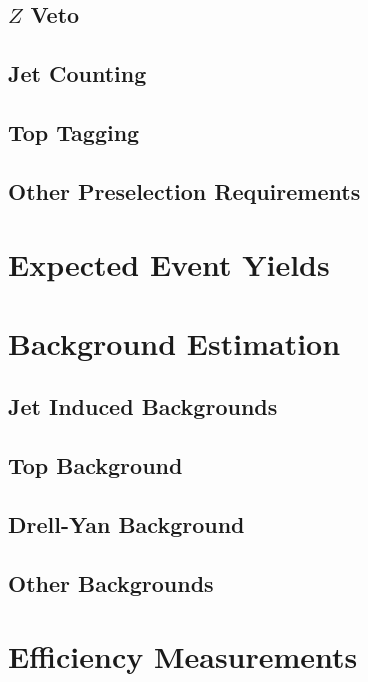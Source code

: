 \documentclass{cmspaper}
\begin{document}
  \subsection{$Z$ Veto}
    \label{sec:sel_zveto}
  \subsection{Jet Counting} 
    \label{sec:sel_jets}
  \subsection{Top Tagging}
    \label{sec:sel_toptag}
  \subsection{Other Preselection Requirements}
    \label{sec:sel_other}

\section{Expected Event Yields}
  \label{sec:yields}

\clearpage
\section{Background Estimation}
    \label{sec:backgrounds}
    \label{sec:bkg_intro}
  \subsection{Jet Induced Backgrounds}
    \label{sec:bkg_fakes}
  \subsection{Top Background}
    \label{sec:bkg_top}
  \subsection{Drell-Yan Background}
    \label{sec:bkg_dy}
  \subsection{Other Backgrounds}
    \label{sec:bkg_other}

\section{Efficiency Measurements}
    \label{sec:alleff}
\end{document}
